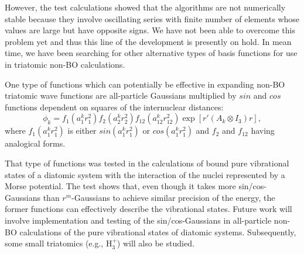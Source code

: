 However, the test calculations showed that the algorithms are not numerically 
stable because they involve oscillating series with finite number of elements 
whose values are large but have opposite signs. We have not been able to overcome 
this problem yet and thus this line of the development is presently on hold. 
In mean time, we have been searching for other alternative types of basis functions 
for use in triatomic non-BO calculations.

One type of functions which can potentially be effective in expanding non-BO 
triatomic wave functions are all-particle Gaussians multiplied by $sin$ and $cos$ 
functions dependent on squares of the internuclear distances:
\begin{equation}
\phi_k = f_1(a_1^k r_1^2 ) f_2(a_2^k r_2^2 ) f_{12}(a_{12}^k r_{12}^2 ) 
\exp [r'(A_k \otimes I_3) r],
\label{3_2}
\end{equation}
where $f_1(a_1^k r_1^2 )$ is either $sin(a_1^k r_1^2 )$ or $cos(a_1^k r_1^2 )$ 
and $f_2$ and $f_{12}$ having analogical forms.

That type of functions was tested in the calculations of bound pure vibrational 
states of a diatomic system with the interaction of the nuclei represented by a 
Morse potential. The test shows that, even though it takes more sin/cos-Gaussians 
than $r^m$-Gaussians to achieve similar precision of the energy, the former functions 
can effectively describe the vibrational states. Future work will involve implementation 
and testing of the sin/cos-Gaussians in all-particle non-BO calculations of the pure
vibrational states of diatomic systems. 
Subsequently, some small triatomics (e.g., H$_3^+$) will also be studied.